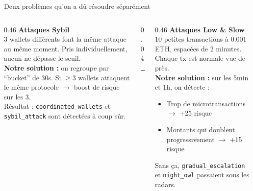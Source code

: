 \documentclass[aspectratio=169,12pt]{beamer}
\newenvironment{tightitemize}{%
  \setlength{\topsep}{1pt}\setlength{\partopsep}{0pt}%
  \begin{itemize}\setlength{\itemsep}{1pt}\setlength{\parskip}{0pt}}{\end{itemize}}
\begin{document}
\begin{frame}{Deux problèmes qu'on a dû résoudre séparément}
  \begin{columns}[T]
    \begin{column}{0.46\textwidth}
      \textbf{\color{primary} Attaques Sybil}\\[0.15cm]
      3 wallets différents font la même attaque au même moment. Pris individuellement, aucun ne dépasse le seuil.\\[0.2cm]
      \textbf{Notre solution :} on regroupe par ``bucket'' de 30s. Si $\geq 3$ wallets attaquent le même protocole $\to$ boost de risque sur les 3.\\[0.2cm]
      {\small\color{midgray} Résultat : \texttt{coordinated\_wallets} et \texttt{sybil\_attack} sont détectées à coup sûr.}
    \end{column}
    \begin{column}{0.04\textwidth}
      {\color{lightgray}\rule{0.5pt}{4cm}}
    \end{column}
    \begin{column}{0.46\textwidth}
      \textbf{\color{accent} Attaques Low \& Slow}\\[0.15cm]
      10 petites transactions à 0.001 ETH, espacées de 2 minutes. Chaque tx est normale vue de près.\\[0.2cm]
      \textbf{Notre solution :} sur les 5min et 1h, on détecte :
      \begin{tightitemize}
        \item Trop de microtransactions $\to$ +25 risque
        \item Montants qui doublent progressivement $\to$ +15 risque
      \end{tightitemize}
      \vspace{0.15cm}
      {\small\color{midgray} Sans ça, \texttt{gradual\_escalation} et \texttt{night\_owl} passaient sous les radars.}
    \end{column}
  \end{columns}
\end{frame}
\end{document}
